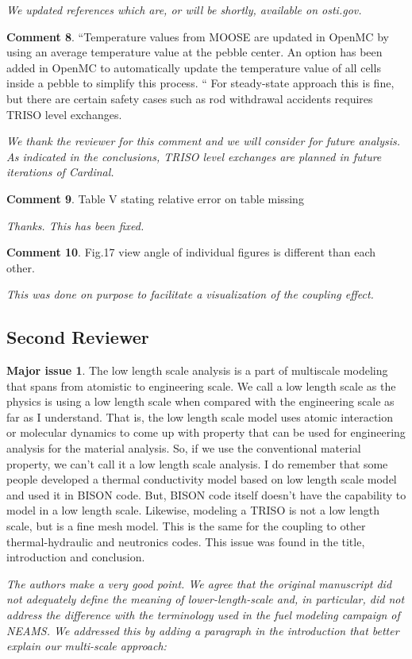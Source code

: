 \documentclass{nseJournal}
\begin{document}
\textit{We updated references which are, or will be shortly, available on osti.gov.}

\textbf{Comment 8}. “Temperature values from MOOSE are updated in OpenMC by using an average temperature value
at the pebble center. An option has been added in OpenMC to automatically update the temperature
value of all cells inside a pebble to simplify this process. “
For steady-state approach this is fine, but there are certain safety cases such as rod withdrawal accidents requires TRISO level exchanges.

\textit{We thank the reviewer for this comment and we will consider for future analysis. As indicated in the conclusions, TRISO level exchanges are planned in future iterations of Cardinal.}

\textbf{Comment 9}. Table V stating relative error on table missing

\textit{Thanks. This has been fixed.}

\textbf{Comment 10}. Fig.17 view angle of individual figures is different than each other.

\textit{This was done on purpose to facilitate a visualization of the coupling effect.}

\subsection*{Second Reviewer}

\textbf{Major issue 1}.  The low length scale analysis is a part of multiscale modeling that spans from atomistic to engineering scale. We call a low length scale as the physics is using a low length scale when compared with the engineering scale as far as I understand. That is, the low length scale model uses atomic interaction or molecular dynamics to come up with property that can be used for engineering analysis for the material analysis. So, if we use the conventional material property, we can't call it a low length scale analysis. I do remember that some people developed a thermal conductivity model based on low length scale model and used it in BISON code. But, BISON code itself doesn't have the capability to model in a low length scale. Likewise, modeling a TRISO is not a low length scale, but is a fine mesh model. This is the same for the coupling to other thermal-hydraulic and neutronics codes. This issue was found in the title, introduction and conclusion.

\textit{The authors make a very good point. We agree that the original manuscript did not adequately define the meaning of lower-length-scale and, in particular, did not address the difference with the terminology used in the fuel modeling campaign of NEAMS. We addressed this by adding a paragraph in the introduction that better explain our multi-scale approach:}
\end{document}
